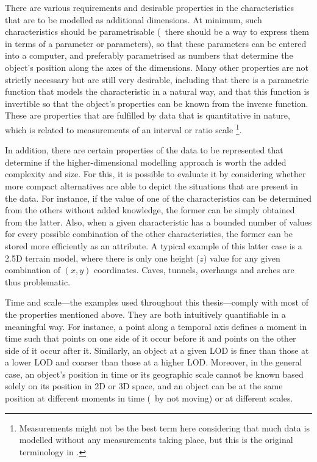 There are various requirements and desirable properties in the characteristics that are to be modelled as additional dimensions.
At minimum, such characteristics should be parametrisable (\ie\ there should be a way to express them in terms of a parameter or parameters), so that these parameters can be entered into a computer, and preferably parametrised as numbers that determine the object's position along the axes of the dimensions.
Many other properties are not strictly necessary but are still very desirable, including that there is a parametric function that models the characteristic in a natural way, and that this function is invertible so that the object's properties can be known from the inverse function.
These are properties that are fulfilled by data that is quantitative in nature, which is related to measurements of an interval or ratio scale \citep{Stevens46}\footnote{Measurements might not be the best term here considering that much data is modelled without any measurements taking place, but this is the original terminology in \citet{Stevens46}.}.

In addition, there are certain properties of the data to be represented that determine if the higher-dimensional modelling approach is worth the added complexity and size.
For this, it is possible to evaluate it by considering whether more compact alternatives are able to depict the situations that are present in the data.
For instance, if the value of one of the characteristics can be determined from the others without added knowledge, the former can be simply obtained from the latter.
Also, when a given characteristic has a bounded number of values for every possible combination of the other characteristics, the former can be stored more efficiently as an attribute.
A typical example of this latter case is a 2.5D terrain model, where there is only one height ($z$) value for any given combination of $(x,y)$ coordinates.
Caves, tunnels, overhangs and arches are thus problematic.

Time and scale---the examples used throughout this thesis---comply with most of the properties mentioned above.
They are both intuitively quantifiable in a meaningful way.
For instance, a point along a temporal axis defines a moment in time such that points on one side of it occur before it and points on the other side of it occur after it.
Similarly, an object at a given LOD is finer than those at a lower LOD and coarser than those at a higher LOD.\@
Moreover, in the general case, an object's position in time or its geographic scale cannot be known based solely on its position in 2D or 3D space, and an object can be at the same position at different moments in time (\eg\ by not moving) or at different scales.

